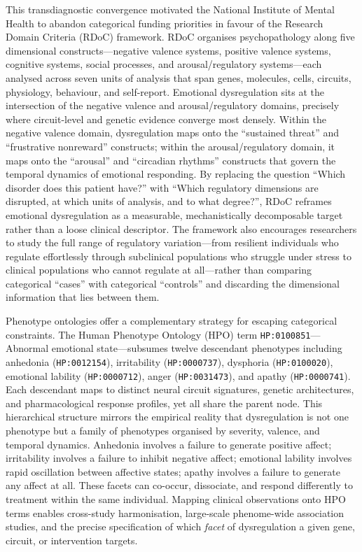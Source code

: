 This transdiagnostic convergence motivated the National Institute of Mental
Health to abandon categorical funding priorities in favour of the Research
Domain Criteria (RDoC) framework.  RDoC organises psychopathology
along five dimensional constructs---negative valence systems, positive
valence systems, cognitive systems, social processes, and
arousal/regulatory systems---each analysed across seven units of analysis
that span genes, molecules, cells, circuits, physiology, behaviour, and
self-report.  Emotional dysregulation sits at the intersection of the
negative valence and arousal/regulatory domains, precisely where
circuit-level and genetic evidence converge most densely.  Within the
negative valence domain, dysregulation maps onto the ``sustained threat''
and ``frustrative nonreward'' constructs; within the arousal/regulatory
domain, it maps onto the ``arousal'' and ``circadian rhythms'' constructs
that govern the temporal dynamics of emotional responding.  By replacing
the question ``Which disorder does this patient have?'' with ``Which
regulatory dimensions are disrupted, at which units of analysis, and to
what degree?'', RDoC reframes emotional dysregulation as a measurable,
mechanistically decomposable target rather than a loose clinical
descriptor.  The framework also encourages researchers to study the full
range of regulatory variation---from resilient individuals who regulate
effortlessly through subclinical populations who struggle under stress to
clinical populations who cannot regulate at all---rather than comparing
categorical ``cases'' with categorical ``controls'' and discarding the
dimensional information that lies between them.

Phenotype ontologies offer a complementary strategy for escaping categorical
constraints.  The Human Phenotype Ontology (HPO) term
\texttt{HP:0100851}---Abnormal emotional state---subsumes twelve descendant
phenotypes including anhedonia (\texttt{HP:0012154}), irritability
(\texttt{HP:0000737}), dysphoria (\texttt{HP:0100020}), emotional lability
(\texttt{HP:0000712}), anger (\texttt{HP:0031473}), and apathy
(\texttt{HP:0000741}).  Each descendant maps to distinct neural
circuit signatures, genetic architectures, and pharmacological response
profiles, yet all share the parent node.  This hierarchical structure
mirrors the empirical reality that dysregulation is not one phenotype but a
family of phenotypes organised by severity, valence, and temporal dynamics.
Anhedonia involves a failure to generate positive affect; irritability
involves a failure to inhibit negative affect; emotional lability involves
rapid oscillation between affective states; apathy involves a failure to
generate any affect at all.  These facets can co-occur, dissociate, and
respond differently to treatment within the same individual.  Mapping
clinical observations onto HPO terms enables cross-study harmonisation,
large-scale phenome-wide association studies, and the precise specification
of which \emph{facet} of dysregulation a given gene, circuit, or
intervention targets.

